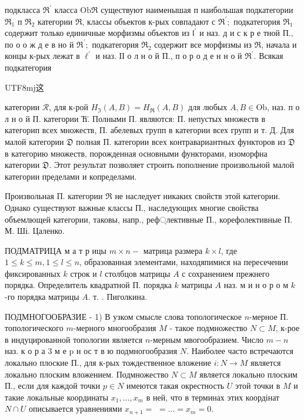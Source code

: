 \documentclass[10pt]{article}
\begin{document}
подкласса $\mathfrak{R}^{\prime}$ класса $\mathrm{Ob} \mathfrak{\Re}$ существуют наименышая п наибольшая подкатегории $\Re_{1}$ п $\Re_{2}$ категории $\mathfrak{\Re}$, классы объектов к-рых совпадают с $\Re^{\prime} ;$ подкатегория $\Re_{1}$ содержит только единичные морфизмы объектов из $\mathfrak{l}^{\prime}$ и наз. д и с к р е тной П., по о о ж д е в но й $\mathfrak{R}^{\prime} ;$ подкатегория $\mathfrak{R}_{2}$ содержит все морфизмы из $\mathfrak{R}$, начала и концы к-рых лежат в $\mathfrak{\ell}^{\prime}$ и наз. ІІ о л н о й П., п о р о д е н н о й $\mathfrak{R}^{\prime}$. Всякая подкатегория \begin{CJK}{UTF8}{mj}这\end{CJK} категории $\mathscr{R}$, для к-рой $H_{\mathfrak{I}}(A, B)=H_{\mathfrak{R}}(A, B)$ для любых $A, B \in \mathrm{Ob}$, наз. п о л н о й П. категории Ћ̈. Полными П. являются: П. непустых множеств в категорип всех множеств, П. абелевых групп в категории всех групп и т. Д. Для малой категории $\mathfrak{D}$ полная П. категории всех контравариантных функторов из $\mathfrak{D}$ в категорию множеств, порожденная основными функторами, изоморфна категории $\mathfrak{D}$. Этот результат позволяет строить пополнение произвольной малой категории пределами и копределами.



Произвольная П. категории $\Re$ не наследует никаких свойств этой категории. Однако существуют важные классы П., наследующих многие свойства объемлющей категории, таковы, напр., реф্лективные П., корефолективные П. М. Ші. Цаленко.



ПОДМАТРИЦА м а т р ицы $m \times n-$ матрица размера $k \times l$, где $1 \leqslant k \leqslant m, 1 \leqslant l \leqslant n$, образованная элементами, находяпимися на пересечении фиксированных $k$ строк и $l$ столбцов матрицы $A$ с сохранением прежнего порядка. Определитель квадратной П. порядка $k$ матрицы $A$ наз. м и н о р о м $k$-го порядка матрицы $A$. т. . Пиголкина.



ПОДМНОГООБРАЗИЕ - 1) В узком смысле слова топологическое $n$-мерное П. топологического $m$-мерного многообразия $M$ - такое подмножество $N \subset M$, к-рое в индуцированной топологии является $n$-мерным мвогообразием. Число $m-n$ наз. к о р а 3 м е $\mathrm{p}$ н ос т в ю подмногообразия $N$. Наиболее часто встречаются локально плоские П., для к-рых тождественное вложение $i: N \rightarrow M$ является локально плоским вложением. Подмножество $N \subset M$ является локально плоским П., если для каждой точки $p \in N$ имеются такая окрестность $U$ этой точки в $M$ и такие локальные координаты $x_{1}, \ldots, x_{m}$ в ней, что в терминах этих коордінат $N \cap U$ описывается уравнениями $x_{n+1}=$ $=\ldots=x_{m}=0$.
\end{document}
